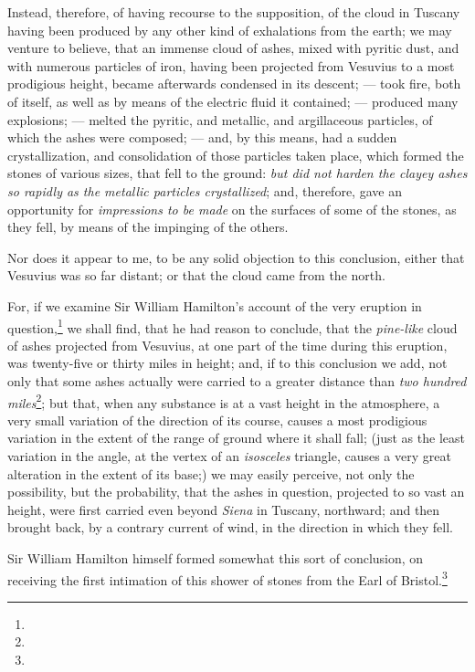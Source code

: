 \documentclass[a4paper, 12pt, oneside]{article}
\begin{document}
Instead, therefore, of having recourse to the supposition, of the cloud in Tuscany having been produced by any other kind of exhalations from the earth; we may venture to believe, that an immense cloud of ashes, mixed with pyritic dust, and with numerous particles of iron, having been projected from Vesuvius to a most prodigious height, became afterwards condensed in its descent; --- took fire, both of itself, as well as by means of the electric fluid it contained; --- produced many explosions; --- melted the pyritic, and metallic, and argillaceous particles, of which the ashes were composed; --- and, by this means, had a sudden crystallization, and consolidation of those particles taken place, which formed the stones of various sizes, that fell to the ground: \emph{but did not harden the clayey ashes so rapidly as the metallic particles crystallized}; and, therefore, gave an opportunity for \emph{impressions to be made} on the surfaces of some of the stones, as they fell, by means of the impinging of the others.

Nor does it appear to me, to be any solid objection to this conclusion, either that Vesuvius was so far distant; or that the cloud came from the north.

For, if we examine Sir William Hamilton's account of the very eruption in question,\footnote{} we shall find, that he had reason to conclude, that the \emph{pine-like} cloud of ashes projected from Vesuvius, at one part of the time during this eruption, was twenty-five or thirty miles in height; and, if to this conclusion we add, not only that some ashes actually were carried to a greater distance than \emph{two hundred miles}\footnote{}; but that, when any substance is at a vast height in the atmosphere, a very small variation of the direction of its course, causes a most prodigious variation in the extent of the range of ground where it shall fall; (just as the least variation in the angle, at the vertex of an \emph{isosceles} triangle, causes a very great alteration in the extent of its base;) we may easily perceive, not only the possibility, but the probability, that the ashes in question, projected to so vast an height, were first carried even beyond \emph{Siena} in Tuscany, northward; and then brought back, by a contrary current of wind, in the direction in which they fell.

Sir William Hamilton himself formed somewhat this sort of conclusion, on receiving the first intimation of this shower of stones from the Earl of Bristol.\footnote{}
\end{document}
